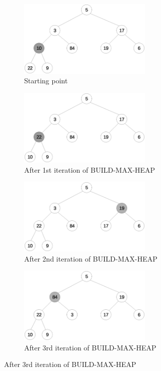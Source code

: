 \documentclass[11pt]{article}
\begin{document}
\begin{enumerate}
\begin{figure}[!h]
		\begin{subfigure}{.5\textwidth}
			\centerline{\includegraphics[width=2.5in]{prob-6-3-1_1.eps}}
			\caption{Starting point}
			\label{fig:prob-6-3-1_1}
		\end{subfigure}%
		\begin{subfigure}{.5\textwidth}
			\centerline{\includegraphics[width=2.5in]{prob-6-3-1_2.eps}}
			\caption{After 1st iteration of BUILD-MAX-HEAP}
			\label{fig:prob-6-3-1_2}
		\end{subfigure}
		
		\begin{subfigure}{.5\textwidth}
			\centerline{\includegraphics[width=2.5in]{prob-6-3-1_3.eps}}
			\caption{After 2nd iteration of BUILD-MAX-HEAP}
			\label{fig:prob-6-3-1_3}
		\end{subfigure}%
		\begin{subfigure}{.5\textwidth}
			\centerline{\includegraphics[width=2.5in]{prob-6-3-1_4.eps}}
			\caption{After 3rd iteration of BUILD-MAX-HEAP}
			\label{fig:prob-6-3-1_4}
		\end{subfigure}
				

\end{figure}
\end{enumerate}
\end{document}
